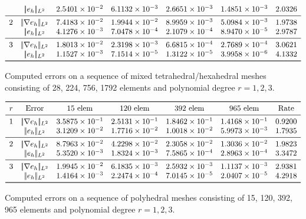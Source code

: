\documentclass[12pt, a4paper]{article}
\theoremstyle{definition}
\theoremstyle{plain}
\theoremstyle{plain}
\theoremstyle{definition}
\begin{document}
\begin{table}[h!]
\[\begin{array}{ccccccc}
	& |\!|e_{h}|\!|_{L^2} & 2.5401 \times 10^{-2} & 6.1132 \times 10^{-3} & 2.6651 \times 10^{-3} & 
	1.4851 \times 10^{-3} & 2.0326\\
	\midrule
	2 & |\!|\nabla e_{h}|\!|_{L^2} & 7.4183 \times 10^{-2} & 1.9944 \times 
	10^{-2} & 8.9959 \times 10^{-3} & 5.0984 \times 10^{-3} & 1.9738\\
	& |\!|e_{h}|\!|_{L^2} & 4.1276 \times 10^{-3} & 7.0478 \times 10^{-4} & 2.1079 \times 10^{-4} & 
	8.9470 \times 10^{-5} & 2.9787\\
	\midrule
	3 & |\!|\nabla e_{h}|\!|_{L^2} & 1.8013 \times 10^{-2} & 2.3198 \times 
	10^{-3} & 6.6815 \times 10^{-4} & 2.7689 \times 10^{-4} & 3.0621\\
	& |\!|e_{h}|\!|_{L^2} & 1.1527 \times 10^{-3} & 7.1514 \times 10^{-5} & 1.3122 \times 10^{-5} & 
	3.9958 \times 10^{-6} & 4.1332\\
	\bottomrule
	\end{array}
	\]
	\caption{Computed errors on a sequence of mixed tetrahedral/hexahedral 
	meshes consisting of 28, 224, 756, 1792 elements and polynomial degree 
	$r=1,2,3$.} \label{tab:hhextet}
	\[
	\begin{array}{ccccccc}
	\toprule
	r & \text{Error} & \text{15 elem} & \text{120 elem} & \text{392 elem} & 
	\text{965 elem} & \text{Rate} \\ 
	\midrule
	1 & |\!|\nabla e_{h}|\!|_{L^2} & 3.5875 \times 10^{-1} & 2.5131 \times 
	10^{-1} & 1.8462 \times 10^{-1} & 1.4168 \times 10^{-1} & 0.9200\\
	& |\!|e_{h}|\!|_{L^2} & 3.1209 \times 10^{-2} & 1.7716 \times 10^{-2} & 1.0018 \times 10^{-2} & 
	5.9973 \times 10^{-3} & 1.7935\\
	\midrule
	2 & |\!|\nabla e_{h}|\!|_{L^2} & 8.7963 \times 10^{-2} & 4.2298 \times 
	10^{-2} & 2.3058 \times 10^{-2} & 1.3036 \times 10^{-2} & 1.9823\\
	& |\!|e_{h}|\!|_{L^2} & 5.3520 \times 10^{-3} & 1.8324 \times 10^{-3} & 7.5865 \times 10^{-4} & 2.8963 \times 10^{-4} & 3.3472\\
	\midrule
	3 & |\!|\nabla e_{h}|\!|_{L^2} & 1.9945 \times 10^{-2} & 6.1835 \times 
	10^{-3} & 2.5932 \times 10^{-3} & 1.1137 \times 10^{-3} & 2.9381\\
	& |\!|e_{h}|\!|_{L^2} & 1.4164 \times 10^{-3} & 2.2474 \times 10^{-4} & 7.0145 \times 10^{-5} & 2.0407 \times 10^{-5} & 4.2918\\
	\bottomrule
	\end{array}
	\]
	\caption{Computed errors on a sequence of polyhedral meshes consisting of 
	15, 120, 392, 965 elements and polynomial degree $r=1,2,3$.} \label{tab:hpol}
\end{table}
\end{document}
